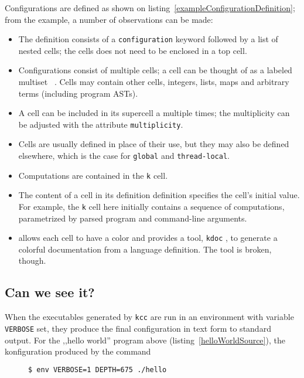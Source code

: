 \documentclass{fithesis3}
\newcommand{\kdoc}{\texttt{kdoc} }
\newcommand{\kcc}{\texttt{kcc} } %
\begin{document}
Configurations are defined as shown on listing~\ref{exampleConfigurationDefinition}; from the example, a number of observations can be made:
\begin{itemize}
\item The definition consists of a \texttt{configuration} keyword followed by a list of nested cells; the cells does not need to be enclosed in a top cell.
\item Configurations consist of multiple cells; a cell can be thought of as a labeled multiset ~\cite{hathhorn-ellison-rosu-2015-pldi}. Cells may contain other cells, integers, lists, maps and arbitrary terms (including program ASTs).
\item A cell can be included in its supercell a multiple times; the multiplicity can be adjusted with the attribute \texttt{multiplicity}.
\item Cells are usually defined in place of their use, but they may also be defined elsewhere, which is the case for \texttt{global} and \texttt{thread-local}.
\item Computations are contained in the \texttt{k} cell.
\item The content of a cell in its definition definition specifies the cell's initial value. For example, the \texttt{k} cell here initially contains a sequence of computations, parametrized by parsed program and command-line arguments.
\item \K allows each cell to have a color and provides a tool, \kdoc , to generate a colorful documentation from a language definition. The tool is broken, though.
\end{itemize}


\subsection{Can we see it?}

When the executables generated by \kcc are run in an environment with variable \texttt{VERBOSE} set, they produce the final configuration in text form to standard output. For the ,,hello world'' program above (listing~\ref{helloWorldSource}), the konfiguration produced by
the command
\begin{figure}[h]
\begin{lstlisting}[language=bash]
$ env VERBOSE=1 DEPTH=675 ./hello
\end{lstlisting}
\label{exampleConfigurationCommand}
\end{figure}
\end{document}
